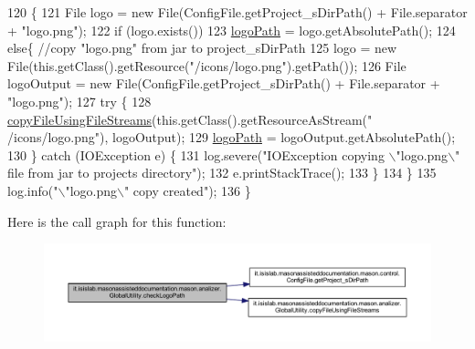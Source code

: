 \begin{DoxyCode}
120                                  \{
121         File logo = \textcolor{keyword}{new} File(ConfigFile.getProject\_sDirPath() + File.separator + \textcolor{stringliteral}{"logo.png"});
122         \textcolor{keywordflow}{if} (logo.exists())
123             \hyperlink{classit_1_1isislab_1_1masonassisteddocumentation_1_1mason_1_1analizer_1_1_global_utility_aeb806bda4a3b7b9099e2197bdca5cd75}{logoPath} = logo.getAbsolutePath();
124         \textcolor{keywordflow}{else}\{ \textcolor{comment}{//copy "logo.png" from jar to project\_sDirPath}
125             logo = \textcolor{keyword}{new} File(this.getClass().getResource(\textcolor{stringliteral}{"/icons/logo.png"}).getPath());
126             File logoOutput = \textcolor{keyword}{new} File(ConfigFile.getProject\_sDirPath() + File.separator + \textcolor{stringliteral}{"logo.png"});
127             \textcolor{keywordflow}{try} \{
128                 \hyperlink{classit_1_1isislab_1_1masonassisteddocumentation_1_1mason_1_1analizer_1_1_global_utility_adb83aee7a7166b3826c7f3cf4ada53a9}{copyFileUsingFileStreams}(this.getClass().getResourceAsStream(\textcolor{stringliteral}{"
      /icons/logo.png"}), logoOutput);
129                 \hyperlink{classit_1_1isislab_1_1masonassisteddocumentation_1_1mason_1_1analizer_1_1_global_utility_aeb806bda4a3b7b9099e2197bdca5cd75}{logoPath} = logoOutput.getAbsolutePath();
130             \} \textcolor{keywordflow}{catch} (IOException e) \{
131                 log.severe(\textcolor{stringliteral}{"IOException copying \(\backslash\)"logo.png\(\backslash\)" file from jar to projects directory"});
132                 e.printStackTrace();
133             \}
134         \}
135         log.info(\textcolor{stringliteral}{"\(\backslash\)"logo.png\(\backslash\)" copy created"});
136     \}
\end{DoxyCode}


Here is the call graph for this function\-:\nopagebreak
\begin{figure}[H]
\begin{center}
\leavevmode
\includegraphics[width=350pt]{classit_1_1isislab_1_1masonassisteddocumentation_1_1mason_1_1analizer_1_1_global_utility_a66a1a8d4779245f596a65fd8d95362b2_cgraph}
\end{center}
\end{figure}




